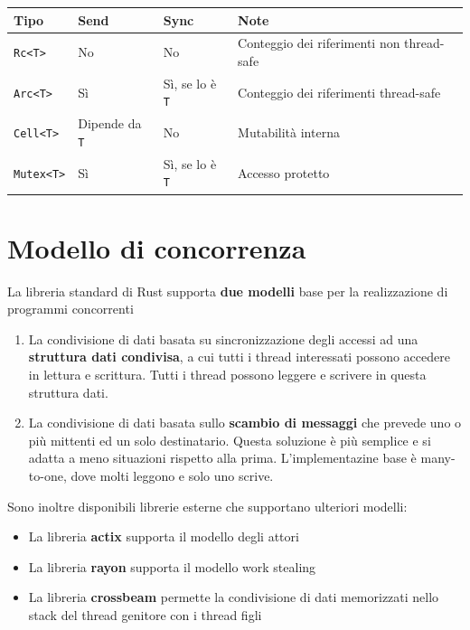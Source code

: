 \begin{table}[h!]
  \renewcommand{\arraystretch}{1.5}
  \centering
  \begin{tabular}{l l l l}
    \toprule
    \textbf{Tipo}     & \textbf{Send}         & \textbf{Sync}          & \textbf{Note}                             \\
    \midrule
    \texttt{Rc<T>}    & No                    & No                     & Conteggio dei riferimenti non thread-safe \\
    \texttt{Arc<T>}   & Sì                    & Sì, se lo è \texttt{T} & Conteggio dei riferimenti thread-safe     \\
    \texttt{Cell<T>}  & Dipende da \texttt{T} & No                     & Mutabilità interna                        \\
    \texttt{Mutex<T>} & Sì                    & Sì, se lo è \texttt{T} & Accesso protetto                          \\
    \bottomrule
  \end{tabular}
\end{table}


\section{Modello di concorrenza}
La libreria standard di Rust supporta \textbf{due modelli} base per la realizzazione di
programmi concorrenti

\begin{enumerate}
  \item La condivisione di dati basata su sincronizzazione degli accessi ad
        una \textbf{struttura dati condivisa}, a cui tutti i thread interessati possono
        accedere in lettura e scrittura.
        Tutti i thread possono leggere e scrivere in questa struttura dati.
  \item La condivisione di dati basata sullo \textbf{scambio di messaggi} che prevede
        uno o più mittenti ed un solo destinatario.
        Questa soluzione è più semplice e si adatta a meno situazioni rispetto alla prima.
        L'implementazine base è many-to-one, dove molti leggono e solo uno scrive.
\end{enumerate}

Sono inoltre disponibili librerie esterne che supportano ulteriori modelli:

\begin{itemize}
  \item La libreria \textbf{actix} supporta il modello degli attori
  \item La libreria \textbf{rayon} supporta il modello work stealing
  \item La libreria \textbf{crossbeam} permette la condivisione di
        dati memorizzati nello stack del thread genitore con i thread figli
\end{itemize}

